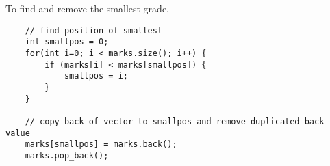 \documentclass[]{article}
\begin{document}
To find and remove the smallest grade,

\begin{lstlisting}
	// find position of smallest
	int smallpos = 0;
	for(int i=0; i < marks.size(); i++) {
		if (marks[i] < marks[smallpos]) {
			smallpos = i;
		}
	}
	
	// copy back of vector to smallpos and remove duplicated back value
	marks[smallpos] = marks.back();
	marks.pop_back();
\end{lstlisting}\bigbreak
\end{document}
